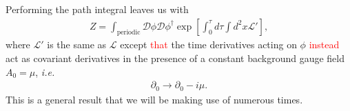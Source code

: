         Performing the path integral leaves us with
        \begin{align}
            Z= \int_{\text{periodic}} \mathcal{D}\phi \mathcal{D}\phi^{\dag} \exp \left[\int_0^{\tau} d\tau \int d^2x \mathcal{L'} \right],
        \end{align}
        where $\mathcal{L'}$ is the same as $\mathcal{L}$ except \textcolor{red}{that} the time derivatives acting on $\phi$ \textcolor{red}{instead} act as covariant derivatives in the presence of a constant background gauge field $A_0=\mu$, \textit{i.e.}
        \begin{align}
            \partial_0 \rightarrow \partial_0 -i \mu. \label{eq:chemical_potential_gauge_field}
        \end{align}
        This is a general result that we will be making use of numerous times.
